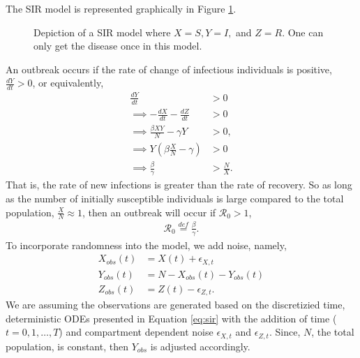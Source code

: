 \documentclass[12pt]{article}
\newcommand{\rr}{\ensuremath{\mathcal{R}_0}}
\begin{document}
The SIR model is represented graphically in Figure \ref{fig::sir}. 
\begin{figure}[h]
\centering
{}
\caption{Depiction of a SIR model where $X=S, Y=I,$ and $Z=R$.  One can only get the disease once in this model.}\label{fig::sir}
\end{figure}
An outbreak occurs if the rate of change of infectious individuals is positive, $\frac{dY}{dt} > 0$, or equivalently,
\begin{align*}
  \frac{dY}{dt} &> 0 \\
  \implies -\frac{dX}{dt} - \frac{dZ}{dt} &> 0 \\
  \implies \frac{\beta X Y}{N}  - \gamma Y &> 0 ,\\
\implies  Y \left ( \beta \frac{X}{N} - \gamma \right ) & > 0\\
\implies   \frac{\beta}{\gamma} &> \frac{N}{X}.
\end{align*}
That is,  the rate of new infections is greater than the rate of recovery.  So as long as the number of initially susceptible individuals is large compared to the total population, $\frac{X}{N} \approx 1$, then an outbreak will occur if $\rr >1$,
\begin{align*}
  \rr \overset{def}{=} \frac{\beta}{\gamma}.
  \end{align*}
  To incorporate randomness into the model, we add noise, namely,
  \begin{align}\label{eq:sir-noise}
    X_{obs}(t) &= X(t) + \epsilon_{X,t}\\
    Y_{obs}(t) &=  N - X_{obs}(t) -Y_{obs}(t)  \nonumber\\
    Z_{obs}(t) &= Z(t) - \epsilon_{Z,t}. \nonumber
  \end{align}
We are assuming the observations are generated based on the discretizied time, deterministic ODEs presented in Equation \ref{eq:sir} with the addition of time ($t=0, 1, \dots, T$) and compartment dependent noise $\epsilon_{X,t}$ and $\epsilon_{Z,t}$.  Since, $N$, the total population, is constant, then $Y_{obs}$ is adjusted accordingly.
\end{document}
